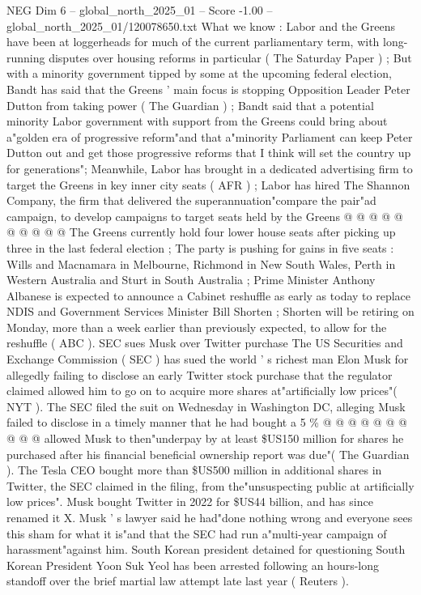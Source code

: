 \begin{textsample}{NEG Dim 6 – global\_north\_2025\_01 – Score -1.00 – global\_north\_2025\_01/120078650.txt}
What we know : Labor and the Greens have been at loggerheads for much of the current parliamentary term, with long-running disputes over housing reforms in particular ( The Saturday Paper ) ; But with a minority government tipped by some at the upcoming federal election, Bandt has said that the Greens ' main focus is stopping Opposition Leader Peter Dutton from taking power ( The Guardian ) ; Bandt said that a potential minority Labor government with support from the Greens could bring about a"golden era of progressive reform"and that a"minority Parliament can keep Peter Dutton out and get those progressive reforms that I think will set the country up for generations"; Meanwhile, Labor has brought in a dedicated advertising firm to target the Greens in key inner city seats ( AFR ) ; Labor has hired The Shannon Company, the firm that delivered the superannuation"compare the pair"ad campaign, to develop campaigns to target seats held by the Greens @ @ @ @ @ @ @ @ @ @ The Greens currently hold four lower house seats after picking up three in the last federal election ; The party is pushing for gains in five seats : Wills and Macnamara in Melbourne, Richmond in New South Wales, Perth in Western Australia and Sturt in South Australia ; Prime Minister Anthony Albanese is expected to announce a Cabinet reshuffle as early as today to replace NDIS and Government Services Minister Bill Shorten ; Shorten will be retiring on Monday, more than a week earlier than previously expected, to allow for the reshuffle ( ABC ).
SEC sues Musk over Twitter purchase The US Securities and Exchange Commission ( SEC ) has sued the world ' s richest man Elon Musk for allegedly failing to disclose an early Twitter stock purchase that the regulator claimed allowed him to go on to acquire more shares at"artificially low prices"( NYT ).
The SEC filed the suit on Wednesday in Washington DC, alleging Musk failed to disclose in a timely manner that he had bought a 5 \% @ @ @ @ @ @ @ @ @ @ allowed Musk to then"underpay by at least \$US150 million for shares he purchased after his financial beneficial ownership report was due"( The Guardian ).
The Tesla CEO bought more than \$US500 million in additional shares in Twitter, the SEC claimed in the filing, from the"unsuspecting public at artificially low prices".
Musk bought Twitter in 2022 for \$US44 billion, and has since renamed it X.
Musk ' s lawyer said he had"done nothing wrong and everyone sees this sham for what it is"and that the SEC had run a"multi-year campaign of harassment"against him.
South Korean president detained for questioning South Korean President Yoon Suk Yeol has been arrested following an hours-long standoff over the brief martial law attempt late last year ( Reuters ).

\end{textsample}
